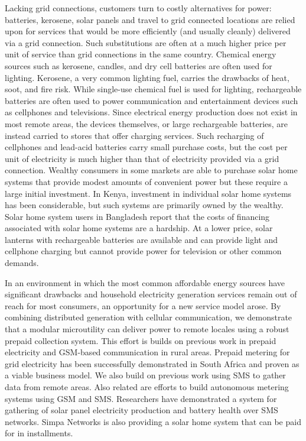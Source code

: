 \documentclass{sig-alternate}
\begin{document}
Lacking grid connections, customers turn to costly alternatives for
power: batteries, kerosene, solar panels and travel to grid connected
locations are relied upon for services that would be more efficiently
(and usually cleanly) delivered via a grid connection.
Such substitutions are often at a much higher price per unit of service
than grid connections in the same country.\cite{Mills:Specter,
Dutt:2004, vanderPlas:1988}
Chemical energy sources such as kerosene, candles, and dry cell batteries
are often used for lighting.
Kerosene, a very common lighting fuel, carries the drawbacks of heat,
soot, and fire risk.
While single-use chemical fuel is used for lighting, rechargeable
batteries are often used to power communication and entertainment devices
such as cellphones and televisions.
Since electrical energy production does not exist in most remote areas,
the devices themselves, or large rechargeable batteries, are instead
carried to stores that offer charging services.
Such recharging of cellphones and lead-acid batteries carry small
purchase costs, but the cost per unit of electricity is much higher than
that of electricity provided via a grid connection.
Wealthy consumers in some markets are able to purchase
solar home systems that provide modest amounts of convenient
power but these require a large initial investment.
In Kenya, investment in individual solar home systems has been
considerable, but such systems are primarily owned by the
wealthy.\cite{Jacobson:Connective}
Solar home system users in Bangladesh report that the costs of financing
associated with solar home systems are a hardship.\cite{Mondal:SHSBangladesh:2011}
At a lower price, solar lanterns with rechargeable batteries are available
and can provide light and cellphone charging but cannot provide 
power for television or other common demands.

In an environment in which the most common affordable energy sources
have significant drawbacks and household electricity generation
services remain out of reach for most consumers, an opportunity for a
new service model arose.
By combining distributed generation with cellular communication, we
demonstrate that a modular microutility can deliver power to remote
locales using a robust prepaid collection system.
This effort is builds on previous work in prepaid electricity and
GSM-based communication in rural areas.
Prepaid metering for grid electricity has been successfully demonstrated
in South Africa and proven as a viable business model.\cite{Tewari:2003}
We also build on previous work using SMS to gather data from remote
areas.\cite{RapidSMS, Hartung:2010}
Also related are efforts to build autonomous metering systems using GSM
and SMS.\cite{Ramamurthy:2010}
Researchers have demonstrated a system for gathering of solar panel
electricity production and battery health over SMS networks.\cite{SimbaLink}
Simpa Networks is also providing a solar home system that can be
paid for in installments.\cite{Simpa}
\end{document}
